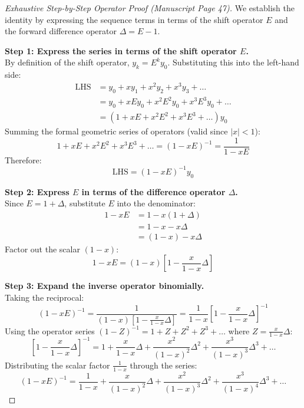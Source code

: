\begin{proof}[Exhaustive Step-by-Step Operator Proof (Manuscript Page 47)]
We establish the identity by expressing the sequence terms in terms of the shift operator $E$ and the forward difference operator $\Delta = E - 1$.

\medskip
\noindent\textbf{Step 1: Express the series in terms of the shift operator $E$.} \\
By definition of the shift operator, $y_k = E^k y_0$. Substituting this into the left-hand side:
\begin{align}
    \text{LHS} &= y_0 + x y_1 + x^2 y_2 + x^3 y_3 + \dots \nonumber \\
    &= y_0 + x E y_0 + x^2 E^2 y_0 + x^3 E^3 y_0 + \dots \nonumber \\
    &= \left( 1 + x E + x^2 E^2 + x^3 E^3 + \dots \right) y_0
\end{align}
Summing the formal geometric series of operators (valid since $|x| < 1$):
\begin{equation}
    1 + x E + x^2 E^2 + x^3 E^3 + \dots = (1 - x E)^{-1} = \frac{1}{1 - x E}
\end{equation}
Therefore:
\begin{equation}
    \text{LHS} = (1 - x E)^{-1} y_0
\end{equation}

\noindent\textbf{Step 2: Express $E$ in terms of the difference operator $\Delta$.} \\
Since $E = 1 + \Delta$, substitute $E$ into the denominator:
\begin{align}
    1 - x E &= 1 - x(1 + \Delta) \nonumber \\
    &= 1 - x - x \Delta \nonumber \\
    &= (1 - x) - x \Delta
\end{align}
Factor out the scalar $(1 - x)$:
\begin{equation}
    1 - x E = (1 - x) \left[ 1 - \frac{x}{1 - x}\Delta \right]
\end{equation}

\noindent\textbf{Step 3: Expand the inverse operator binomially.} \\
Taking the reciprocal:
\begin{equation}
    (1 - x E)^{-1} = \frac{1}{(1 - x) \left[ 1 - \frac{x}{1 - x}\Delta \right]} = \frac{1}{1 - x} \left[ 1 - \frac{x}{1 - x}\Delta \right]^{-1}
\end{equation}
Using the operator series $(1 - Z)^{-1} = 1 + Z + Z^2 + Z^3 + \dots$ where $Z = \frac{x}{1 - x}\Delta$:
\begin{equation}
    \left[ 1 - \frac{x}{1 - x}\Delta \right]^{-1} = 1 + \frac{x}{1 - x}\Delta + \frac{x^2}{(1 - x)^2}\Delta^2 + \frac{x^3}{(1 - x)^3}\Delta^3 + \dots
\end{equation}
Distributing the scalar factor $\frac{1}{1 - x}$ through the series:
\begin{equation}
    (1 - x E)^{-1} = \frac{1}{1 - x} + \frac{x}{(1 - x)^2}\Delta + \frac{x^2}{(1 - x)^3}\Delta^2 + \frac{x^3}{(1 - x)^4}\Delta^3 + \dots
\end{equation}


\end{proof}
